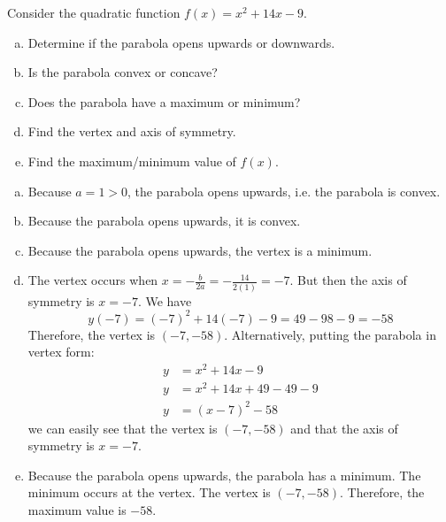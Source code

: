 \documentclass[11pt,letterpaper]{article}
\begin{document}
\newpage





 Consider the quadratic function $f(x)= x^2 + 14 x - 9$.
\begin{enumerate}[(a)]
\item Determine if the parabola opens upwards or downwards.
\item Is the parabola convex or concave?
\item Does the parabola have a maximum or minimum? 
\item Find the vertex and axis of symmetry. 
\item Find the maximum/minimum value of $f(x)$. 
\end{enumerate} \pspace

\sol
\begin{enumerate}[(a)]
\item Because $a= 1 > 0$, the parabola opens upwards, i.e. the parabola is convex. \pspace

\item Because the parabola opens upwards, it is convex. \pspace

\item Because the parabola opens upwards, the vertex is a minimum. \pspace

\item The vertex occurs when $x= -\frac{b}{2a}= -\frac{14}{2(1)}= -7$. But then the axis of symmetry is $x= -7$. We have
	\[
	y(-7)= (-7)^2 + 14(-7) - 9= 49 - 98 - 9= -58
	\]
Therefore, the vertex is $(-7, -58)$. Alternatively, putting the parabola in vertex form:
	\[
	\begin{aligned}
	y&= x^2 + 14x - 9 \\[0.3cm]
	y&= x^2 + 14x + 49 - 49 - 9 \\[0.3cm]
	y&= (x - 7)^2 - 58
	\end{aligned}
	\]
we can easily see that the vertex is $(-7, -58)$ and that the axis of symmetry is $x= -7$. \pspace

\item Because the parabola opens upwards, the parabola has a minimum. The minimum occurs at the vertex. The vertex is $(-7, -58)$. Therefore, the maximum value is $-58$. 
\end{enumerate}





\newpage
\end{document}
